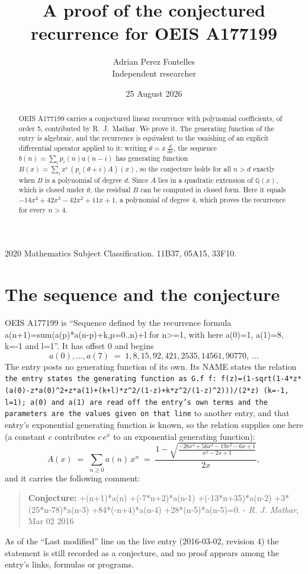 \documentclass[11pt,a4paper]{article}
\title{A proof of the conjectured recurrence for OEIS A177199}
\author{Adrian Perez Fontelles\\ \small Independent researcher}
\date{25 August 2026}
\theoremstyle{plain}
\theoremstyle{definition}
\begin{document}
\maketitle

\begin{abstract}
OEIS A177199 carries a conjectured linear recurrence with polynomial coefficients, of
order 5, contributed by R.~J.~Mathar. We prove it. The generating function of the
entry is algebraic, and the recurrence is equivalent to the vanishing of an explicit
differential operator applied to it: writing $\theta=x\,\frac{d}{dx}$, the sequence
$b(n)=\sum_{i}p_{i}(n)a(n-i)$ has generating function
$B(x)=\sum_{i}x^{i}\,(p_{i}(\theta+i)A)(x)$, so the conjecture holds for all $n>d$ exactly
when $B$ is a polynomial of degree $d$. Since $A$ lies in a quadratic extension of
$\mathbb{Q}(x)$, which is closed under $\theta$, the residual $B$ can be computed in
closed form. Here it equals $- 14 x^{4} + 42 x^{3} - 42 x^{2} + 11 x + 1$, a polynomial of degree $4$, which proves
the recurrence for every $n>4$.
\end{abstract}

\noindent\small 2020 Mathematics Subject Classification. 11B37, 05A15, 33F10.\normalsize

\section{The sequence and the conjecture}

OEIS A177199 is ``Sequence defined by the recurrence formula a(n+1)=sum(a(p)*a(n-p)+k,p=0..n)+l for n>=1, with here a(0)=1, a(1)=8, k=-1 and l=1''. It has offset $0$ and begins
\[
a(0),\dots,a(7)\;=\;1, 8, 15, 92, 421, 2535, 14561, 90770,\ \dots
\]
The entry posts no generating function of its own. Its NAME states the
relation \texttt{the entry states the generating function as G.f f: f(z)=(1-sqrt(1-4*z*(a(0)-z*a(0)\textasciicircum{}2+z*a(1)+(k+l)*z\textasciicircum{}2/(1-z)+k*z\textasciicircum{}2/(1-z)\textasciicircum{}2)))/(2*z) (k=-1, l=1); a(0) and a(1) are read off the entry's own terms and the parameters are the values given on that line} to another entry, and that entry's exponential generating
function is known, so the relation supplies one here (a constant $c$ contributes
$c\,e^{x}$ to an exponential generating function):
\begin{equation}\label{eq:gf}
A(x)\;=\;\sum_{n\ge 0} a(n)\,x^{n}\;=\;\frac{1 - \sqrt{\frac{- 28 x^{4} + 56 x^{3} - 19 x^{2} - 6 x + 1}{x^{2} - 2 x + 1}}}{2 x} ,
\end{equation}
and it carries the following comment:
\begin{quote}\small
\textbf{Conjecture:} +(n+1)*a(n) +(-7*n+2)*a(n-1) +(-13*n+35)*a(n-2) +3*(25*n-78)*a(n-3) +84*(-n+4)*a(n-4) +28*(n-5)*a(n-5)=0. - \emph{R. J. Mathar}, Mar 02 2016
\end{quote}
As of the ``Last modified'' line on the live entry (2016-03-02, revision 4) the
statement is still recorded as a conjecture, and no proof appears among the entry's links,
formulas or programs.
\end{document}
